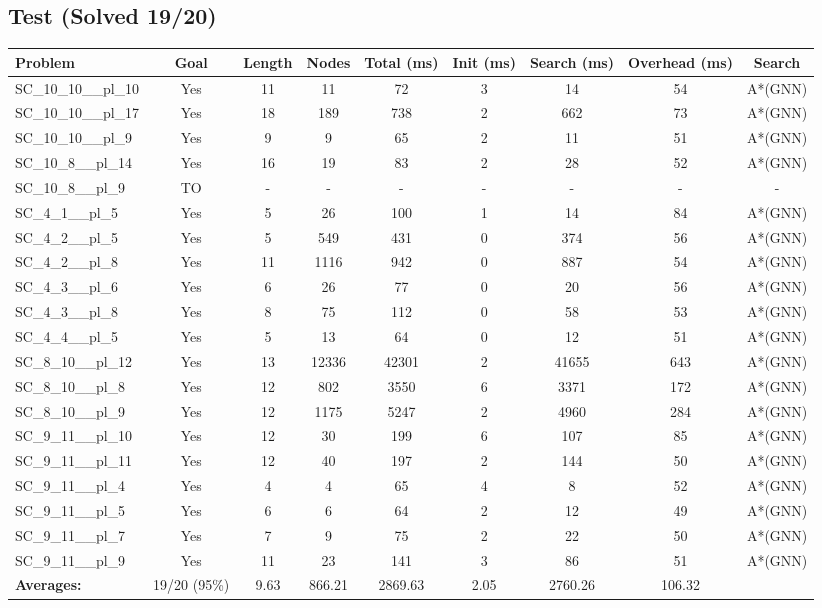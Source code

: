 \documentclass{article}
\begin{document}
\subsection*{Test (Solved 19/20)}
\begin{tabular}{lcccccccc}
\toprule
Problem & Goal & Length & Nodes & Total (ms) & Init (ms) & Search (ms) & Overhead (ms) & Search \\
\midrule
SC\_10\_10\_\_pl\_10 & Yes & 11 & 11 & 72 & 3 & 14 & 54 & A*(GNN) \\
SC\_10\_10\_\_pl\_17 & Yes & 18 & 189 & 738 & 2 & 662 & 73 & A*(GNN) \\
SC\_10\_10\_\_pl\_9 & Yes & 9 & 9 & 65 & 2 & 11 & 51 & A*(GNN) \\
SC\_10\_8\_\_pl\_14 & Yes & 16 & 19 & 83 & 2 & 28 & 52 & A*(GNN) \\
SC\_10\_8\_\_pl\_9 & TO & - & - & - & - & - & - & - \\
SC\_4\_1\_\_pl\_5 & Yes & 5 & 26 & 100 & 1 & 14 & 84 & A*(GNN) \\
SC\_4\_2\_\_pl\_5 & Yes & 5 & 549 & 431 & 0 & 374 & 56 & A*(GNN) \\
SC\_4\_2\_\_pl\_8 & Yes & 11 & 1116 & 942 & 0 & 887 & 54 & A*(GNN) \\
SC\_4\_3\_\_pl\_6 & Yes & 6 & 26 & 77 & 0 & 20 & 56 & A*(GNN) \\
SC\_4\_3\_\_pl\_8 & Yes & 8 & 75 & 112 & 0 & 58 & 53 & A*(GNN) \\
SC\_4\_4\_\_pl\_5 & Yes & 5 & 13 & 64 & 0 & 12 & 51 & A*(GNN) \\
SC\_8\_10\_\_pl\_12 & Yes & 13 & 12336 & 42301 & 2 & 41655 & 643 & A*(GNN) \\
SC\_8\_10\_\_pl\_8 & Yes & 12 & 802 & 3550 & 6 & 3371 & 172 & A*(GNN) \\
SC\_8\_10\_\_pl\_9 & Yes & 12 & 1175 & 5247 & 2 & 4960 & 284 & A*(GNN) \\
SC\_9\_11\_\_pl\_10 & Yes & 12 & 30 & 199 & 6 & 107 & 85 & A*(GNN) \\
SC\_9\_11\_\_pl\_11 & Yes & 12 & 40 & 197 & 2 & 144 & 50 & A*(GNN) \\
SC\_9\_11\_\_pl\_4 & Yes & 4 & 4 & 65 & 4 & 8 & 52 & A*(GNN) \\
SC\_9\_11\_\_pl\_5 & Yes & 6 & 6 & 64 & 2 & 12 & 49 & A*(GNN) \\
SC\_9\_11\_\_pl\_7 & Yes & 7 & 9 & 75 & 2 & 22 & 50 & A*(GNN) \\
SC\_9\_11\_\_pl\_9 & Yes & 11 & 23 & 141 & 3 & 86 & 51 & A*(GNN) \\
\textbf{Averages:} & 19/20 (95\%) & 9.63 & 866.21 & 2869.63 & 2.05 & 2760.26 & 106.32 & \\
\bottomrule
\end{tabular}
\\[0.7cm]
\end{document}
